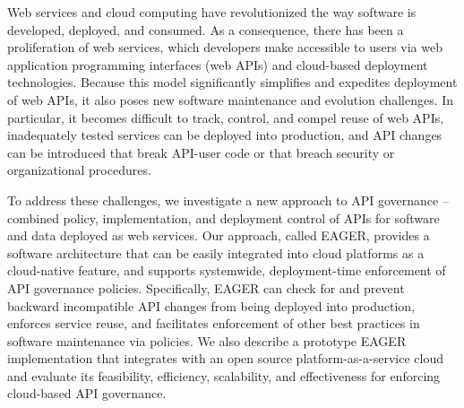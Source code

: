 Web services and cloud computing have revolutionized the way software is
developed, deployed, and consumed.  As a consequence, there has been a
proliferation of web services, which developers make accessible to users via
web application programming interfaces (web APIs) and cloud-based deployment
technologies.  Because this model significantly simplifies and expedites
deployment of web APIs, it also poses new software maintenance and evolution
challenges.  In particular, it becomes difficult to track, control, and compel
reuse of web APIs, inadequately tested services can be
deployed into production, and API changes can be introduced that
break API-user code or that breach security or organizational procedures.

To address these challenges, we investigate a new approach to API governance
-- combined policy, implementation, and deployment control of APIs for
software and data deployed as web services.  Our approach, called EAGER,
provides a software architecture that can be easily integrated into cloud
platforms as a cloud-native feature, and supports systemwide, 
deployment-time enforcement of API governance policies.
Specifically, EAGER can check for and
prevent backward incompatible API changes from
being deployed into production,
enforces service reuse, and facilitates enforcement of other best practices
in software maintenance via policies.  We also describe a prototype
EAGER implementation that
integrates with an open source platform-as-a-service cloud and
evaluate its feasibility, efficiency,
scalability, and effectiveness for enforcing cloud-based API governance.

